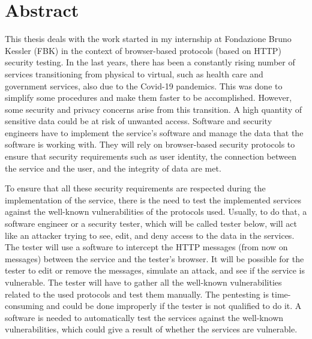 \chapter*{Abstract} %

This thesis deals with the work started in my internship at Fondazione Bruno Kessler (FBK) in the context of browser-based protocols (based on HTTP) security testing.
In the last years, there has been a constantly rising number of services transitioning from physical to virtual, such as health care and government services, also due to the Covid-19 pandemics. This was done to simplify some procedures and make them faster to be accomplished. However, some security and privacy concerns arise from this transition. A high quantity of sensitive data could be at risk of unwanted access. Software and security engineers have to implement the service's software and manage the data that the software is working with. They will rely on browser-based security protocols to ensure that security requirements such as user identity, the connection between the service and the user, and the integrity of data are met. 

To ensure that all these security requirements are respected during the implementation of the service, there is the need to test the implemented services against the well-known vulnerabilities of the protocols used. Usually, to do that, a software engineer or a security tester, which will be called tester below, will act like an attacker trying to see, edit, and deny access to the data in the services. The tester will use a software to intercept the HTTP messages (from now on messages) between the service and the tester's browser. It will be possible for the tester to edit or remove the messages, simulate an attack, and see if the service is vulnerable. The tester will have to gather all the well-known vulnerabilities related to the used protocols and test them manually. The pentesting is time-consuming and could be done improperly if the tester is not qualified to do it. A software is needed to automatically test the services against the well-known vulnerabilities, which could give a result of whether the services are vulnerable.

